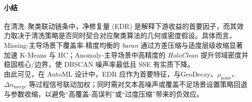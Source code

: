 \documentclass[10pt]{article} %
\numberwithin{equation}{section}
\begin{document}
\paragraph{小结}  
\textcolor[rgb]{0.00,0.07,1.00}{在清洗–聚类联动链条中，净修复量 (EDR) 是解释下游收益的首要因子，而其效力取决于清洗策略是否同时契合对应聚类算法的几何或密度假设。具体而言，Missing-主导场景下覆盖率-精度均衡的 \textit{baran} 通过方差压缩与适度层级收缩显著加速 K-Means 与 HC；Anomaly-主导场景中高精度的 \textit{HoloClean} 提升邻域密度并稳固核心/边界，使 DBSCAN 噪声率最低且 SSE 有实质下降。\\
由此可见，在 AutoML 设计中，EDR 应作为首要特征，与GeoDecay、$\rho_{\text{noise}}$、$\Delta n_{\text{merge}}$ 等过程信号联动加权；同时需对文本高噪声或覆盖不足场景设置策略回退与参数收缩，以避免“高覆盖-高误判”或“过度压缩”带来的负效应。}



\newcommand{\best}[1]{\textbf{#1}}
\newcommand{\worst}[1]{\uline{#1}}
\end{document}
